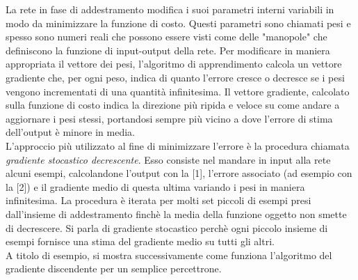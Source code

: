 La rete in fase di addestramento modifica i suoi parametri interni variabili in modo da
 minimizzare la funzione di costo. Questi parametri sono chiamati pesi e spesso sono numeri 
 reali che possono essere visti come delle "manopole" che definiscono la funzione di input-output
  della rete.
Per modificare in maniera appropriata il vettore dei pesi, l’algoritmo di apprendimento calcola 
un vettore gradiente che, per ogni peso, indica di quanto l’errore cresce o decresce se 
i pesi vengono incrementati di una quantità infinitesima. Il vettore gradiente,
 calcolato sulla funzione di costo indica la direzione più ripida e 
 veloce su come andare a aggiornare i pesi stessi, portandosi sempre più vicino a dove
l’errore di stima dell'output è minore in media.\\
L’approccio più utilizzato al fine di minimizzare l’errore è la procedura chiamata \emph{gradiente stocastico 
decrescente}. Esso consiste nel mandare in input alla rete alcuni esempi,
calcolandone l’output con la [1], l’errore associato (ad esempio con la [2]) e il gradiente medio
di questa ultima variando i pesi in maniera infinitesima. La procedura è
iterata per molti set piccoli di esempi presi dall’insieme di addestramento finchè la media
della funzione oggetto non smette di decrescere. Si parla di gradiente stocastico perchè ogni piccolo
 insieme di esempi fornisce una stima del gradiente medio su tutti gli altri.\\
A titolo di esempio, si mostra successivamente come funziona l’algoritmo del gradiente discendente 
per un semplice percettrone. 

